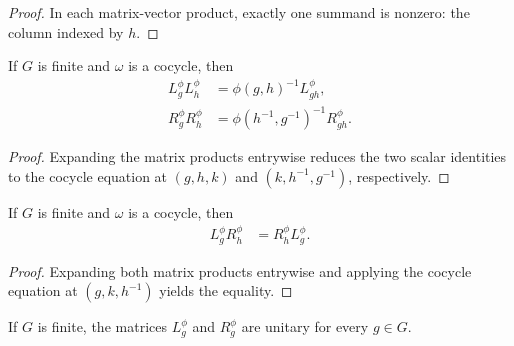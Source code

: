 \begin{proof}\leanok
    In each matrix-vector product, exactly one summand is nonzero: the column
    indexed by $h$.
\end{proof}

\begin{lemma}
    \label{thm:mpug_twisted_regular_multiplication}
    \leanok
    If $G$ is finite and $\omega$ is a cocycle, then
    \begin{align}
        L_g^\phi L_h^\phi
         & =\phi(g,h)^{-1}L_{gh}^\phi,           \\
        R_g^\phi R_h^\phi
         & =\phi(h^{-1},g^{-1})^{-1}R_{gh}^\phi.
        \label{eq:mpug_twisted_regular_multiplication}
    \end{align}
\end{lemma}

\begin{proof}\leanok
    Expanding the matrix products entrywise reduces the two scalar identities
    to the cocycle equation at $(g,h,k)$ and $(k,h^{-1},g^{-1})$, respectively.
\end{proof}

\begin{lemma}
    \label{thm:mpug_twisted_regular_commutation}
    \leanok
    If $G$ is finite and $\omega$ is a cocycle, then
    \begin{align}
        L_g^\phi R_h^\phi
         & =R_h^\phi L_g^\phi.
        \label{eq:mpug_twisted_regular_commutation}
    \end{align}
\end{lemma}

\begin{proof}\leanok
    Expanding both matrix products entrywise and applying the cocycle equation
    at $(g,k,h^{-1})$ yields the equality.
\end{proof}

\begin{lemma}
    \label{thm:mpug_twisted_regular_unitary}
    \leanok
    If $G$ is finite, the matrices $L_g^\phi$ and $R_g^\phi$ are unitary for
    every $g\in G$.
\end{lemma}

